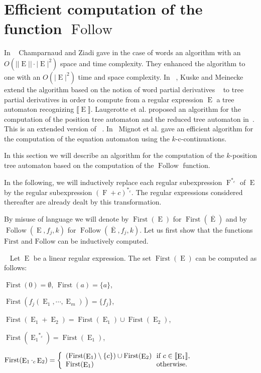 \documentclass{llncs}
\DeclareMathOperator{\First}{First}
\DeclareMathOperator{\Follow}{Follow}
\DeclareMathOperator{\E}{E}
\DeclareMathOperator{\f}{F}
\def\b#1{\overline{#1}}
\begin{document}
\section{Efficient computation of the function $\Follow$}\label{sec algo}
In ~\cite{automate1} Champarnaud and Ziadi gave in the case of words an algorithm with an $O(||\E||\cdot|\E|^2 )$ space and time complexity. 
They enhanced the algorithm to one with an $O(|\E|^2 )$ time and space complexity.
In ~\cite{automate2}, Kuske and Meinecke extend the algorithm based on the notion of word partial derivatives ~\cite{antimirov} to tree partial derivatives in order to compute from a regular expression   $\E$ a tree automaton recognizing $\llbracket \E\rrbracket$. Laugerotte et al. proposed an algorithm for the computation of the position tree automaton and the reduced tree automaton in~\cite{Ouali}. This is an extended version of ~\cite{Ouali}. In~\cite{cie,arxiv2} Mignot et al. gave an efficient algorithm for the computation of the equation automaton using the $k$-c-continuations. 


In this section we will describe an algorithm for the computation of the $k$-position tree automaton based on the computation of the $\Follow$ function.


In the following, we will inductively replace each regular subexpression ${\f}^{*_c}$ of $\E$ by the regular subexpression $(\f+c)^{*_c}$. The regular expressions considered thereafter are already dealt by this transformation.

 
By misuse of language we will denote by $\First(\E)$ for $\First(\b\E)$ and by $\Follow(\E,f_j,k)$ for $\Follow(\b\E,f_j,k)$. Let us first show that the functions $\mathrm{First}$ and $\mathrm{Follow}$ can be inductively computed.
 
  \begin{lemma}\label{firstComput}~\cite{arxiv}
     Let $\E$ be a linear regular expression.  
    The set $\First(\E)$ can be computed as follows:
    
    \centerline{$\First(0)=\emptyset$, $\First(a)=\lbrace a\rbrace$,}
    
\centerline{ $\First(f_j(\E_1, \cdots,\E_m))=\lbrace f_j\rbrace$, 
}    
    
    \centerline{$\First(\E_1+\E_2)=\First(\E_1)\cup\First(\E_2)$,}
    
     \centerline{$\First({\E_1}^{*_c})=\First(\E_1)$,}
    
    \centerline{
      $\First(\E_1\cdot_c \E_2)=
        \left\{
          \begin{array}{l@{\ }l}
            (\First(\E_1)\setminus\{c\}) \cup \First(\E_2) & \text{ if } c\in\llbracket \E_1\rrbracket,\\
            \First(\E_1) & \text{ otherwise.}\\ 
          \end{array}
        \right.
      $
    }
  \end{lemma}  
  
\end{document}
